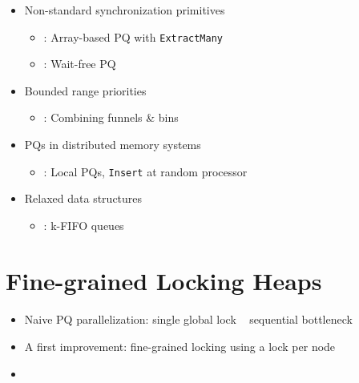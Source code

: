 \documentclass[usenames,dvipsnames]{beamer}
\begin{document}
\begin{frame}{}
\begin{itemize}
\item Non-standard synchronization primitives
    \begin{itemize}
    \item \citeauthor{liu2012lock}: Array-based \ac{PQ} with \lstinline|ExtractMany|
    \item \citeauthor{israeli1993efficient}: Wait-free \ac{PQ}
    \end{itemize}

\item Bounded range priorities
    \begin{itemize}
    \item \citeauthor{shavit1999scalable}: Combining funnels \& bins
    \end{itemize}

\item \acp{PQ} in distributed memory systems
    \begin{itemize}
    \item \citeauthor{sanders1998randomized}: Local \acp{PQ}, \lstinline|Insert| at random processor
    \end{itemize}

\item Relaxed data structures
    \begin{itemize}
    \item \citeauthor{kirsch2012fast}: k-FIFO queues
    \end{itemize}

\end{itemize}
\end{frame}

\section{Fine-grained Locking Heaps} \label{sec:locking}

\begin{frame}{}
\framesubtitle{\citeauthor{hunt1996efficient}}

\begin{itemize}
\item Naive \ac{PQ} parallelization: single global lock \textrightarrow ~ sequential bottleneck
\item A first improvement: fine-grained locking using a lock per node
\item {}
\end{itemize}
\end{frame}
\end{document}
